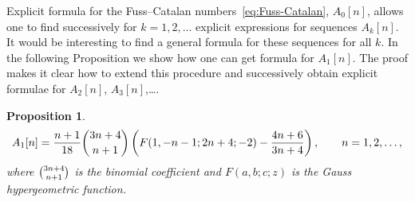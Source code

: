 \documentclass[pdftex]{sigma}
\numberwithin{equation}{section}
\newtheorem{Proposition}[Theorem]{Proposition}
 { \theoremstyle{definition}
\newtheorem{Remark}[Theorem]{Remark} }
\begin{document}
\begin{Remark}
Explicit formula for the Fuss--Catalan numbers~\eqref{eq:Fuss-Catalan}, $A_0[n]$, allows one
to find successively for $k=1,2,\ldots$ explicit expressions for sequences $A_k[n]$.
It would be interesting to find a general formula for these sequences for all $k$. In the following
Proposition we show how one can get formula for $A_1[n]$. The proof makes it clear how to extend this procedure
and successively obtain explicit formulae for $A_2[n]$, $A_3[n]$,\ldots.
\end{Remark}

\begin{Proposition}
\begin{gather}\label{eq:A1n-explicit}
A_1[n]=\frac{n+1}{18}\dbinom{3n+4}{n+1}\left(F(1,-n-1;2n+4;-2)-\frac{4n+6}{3n+4}\right),\qquad
n=1,2,\ldots,
\end{gather}
where $\tbinom{3n+4}{n+1}$ is the binomial coefficient and $F(a,b;c;z)$ is the Gauss hypergeometric function.
\end{Proposition}
\end{document}

